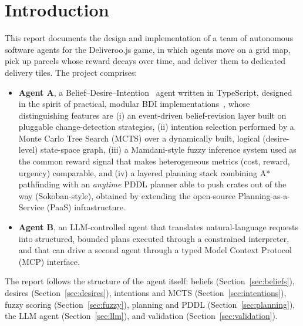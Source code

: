 \section{Introduction}

This report documents the design and implementation of a team of autonomous software agents for
the Deliveroo.js game, in which agents move on a grid map, pick up parcels whose reward decays
over time, and deliver them to dedicated delivery tiles. The project comprises:

\begin{itemize}
    \item \textbf{Agent A}, a Belief--Desire--Intention~\cite{bratman1987} agent written in
    TypeScript, designed in the spirit of practical, modular BDI
    implementations~\cite{caillou2015,traldi2022}, whose
    distinguishing features are (i) an event-driven belief-revision layer built on pluggable
    change-detection strategies, (ii) intention selection performed by a Monte Carlo Tree Search
    (MCTS) over a dynamically built, logical (desire-level) state-space graph, (iii) a
    Mamdani-style fuzzy inference system used as the common reward signal that makes
    heterogeneous metrics (cost, reward, urgency) comparable, and (iv) a layered planning stack
    combining A* pathfinding with an \emph{anytime} PDDL planner able to push crates out of the
    way (Sokoban-style), obtained by extending the open-source Planning-as-a-Service (PaaS)
    infrastructure.
    \item \textbf{Agent B}, an LLM-controlled agent that translates natural-language requests
    into structured, bounded plans executed through a constrained interpreter, and that can drive
    a second agent through a typed Model Context Protocol (MCP) interface.
\end{itemize}

The report follows the structure of the agent itself: beliefs
(Section~\ref{sec:beliefs}), desires (Section~\ref{sec:desires}), intentions and MCTS
(Section~\ref{sec:intentions}), fuzzy scoring (Section~\ref{sec:fuzzy}), planning and PDDL
(Section~\ref{sec:planning}), the LLM agent (Section~\ref{sec:llm}), and validation
(Section~\ref{sec:validation}).
